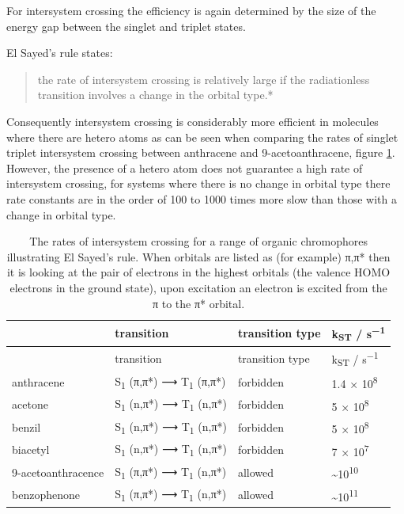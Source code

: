 \documentclass[
]{book}
\begin{document}
For intersystem crossing the efficiency is again determined by the size of the energy gap between the singlet and triplet states.

El Sayed's rule states:

\begin{quote}
the rate of intersystem crossing is relatively large if the radiationless transition involves a change in the orbital type.*
\end{quote}

Consequently intersystem crossing is considerably more efficient in molecules where there are hetero atoms as can be seen when comparing the rates of singlet triplet intersystem crossing between anthracene and 9-acetoanthracene, figure \ref{tab:rateST}. However, the presence of a hetero atom does not guarantee a high rate of intersystem crossing, for systems where there is no change in orbital type there rate constants are in the order of 100 to 1000 times more slow than those with a change in orbital type.

\begin{longtable}[]{@{}llll@{}}
\caption{\label{tab:rateST} The rates of intersystem crossing for a range of organic chromophores illustrating El Sayed's rule. When orbitals are listed as (for example) π,π* then it is looking at the pair of electrons in the highest orbitals (the valence HOMO electrons in the ground state), upon excitation an electron is excited from the π to the π* orbital.}\tabularnewline
\toprule
& transition & transition type & k\textsubscript{ST} / s\textsuperscript{−1} \\
\midrule
\endfirsthead
\toprule
& transition & transition type & k\textsubscript{ST} / s\textsuperscript{−1} \\
\midrule
\endhead
anthracene & S\textsubscript{1} (π,π*) ⟶ T\textsubscript{1} (π,π*) & forbidden & 1.4 × 10\textsuperscript{8} \\
acetone & S\textsubscript{1} (n,π*) ⟶ T\textsubscript{1} (n,π*) & forbidden & 5 × 10\textsuperscript{8} \\
benzil & S\textsubscript{1} (n,π*) ⟶ T\textsubscript{1} (n,π*) & forbidden & 5 × 10\textsuperscript{8} \\
biacetyl & S\textsubscript{1} (n,π*) ⟶ T\textsubscript{1} (n,π*) & forbidden & 7 × 10\textsuperscript{7} \\
9-acetoanthracence & S\textsubscript{1} (π,π*) ⟶ T\textsubscript{1} (n,π*) & allowed & \textasciitilde10\textsuperscript{10} \\
benzophenone & S\textsubscript{1} (π,π*) ⟶ T\textsubscript{1} (n,π*) & allowed & \textasciitilde10\textsuperscript{11} \\
\bottomrule
\end{longtable}
\end{document}
